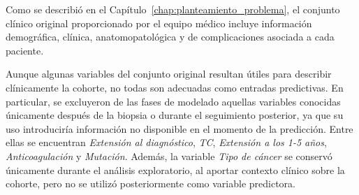 








Como se describió en el Capítulo~\ref{chap:planteamiento_problema}, el conjunto clínico original proporcionado por el equipo médico incluye información demográfica, clínica, anatomopatológica y de complicaciones asociada a cada paciente.

Aunque algunas variables del conjunto original resultan útiles para describir clínicamente la cohorte, no todas son adecuadas como entradas predictivas. En particular, se excluyeron de las fases de modelado aquellas variables conocidas únicamente después de la biopsia o durante el seguimiento posterior, ya que su uso introduciría información no disponible en el momento de la predicción. Entre ellas se encuentran \textit{Extensión al diagnóstico}, \textit{TC}, \textit{Extensión a los 1-5 años}, \textit{Anticoagulación} y \textit{Mutación}. Además, la variable \textit{Tipo de cáncer} se conservó únicamente durante el análisis exploratorio, al aportar contexto clínico sobre la cohorte, pero no se utilizó posteriormente como variable predictora.

